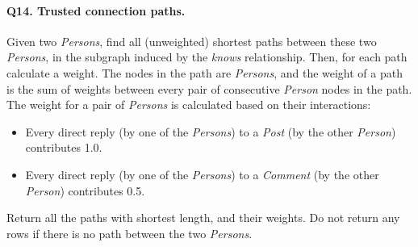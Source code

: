 \paragraph{\textbf{Q14}. Trusted connection paths.}
Given two \emph{Persons}, find all (unweighted) shortest paths between
these two \emph{Persons}, in the subgraph induced by the \emph{knows}
relationship.
Then, for each path calculate a weight. The nodes in the path are
\emph{Persons}, and the weight of a path is the sum of weights between
every pair of consecutive \emph{Person} nodes in the path.
The weight for a pair of \emph{Persons} is calculated based on their
interactions:
\begin{itemize}
\tightlist
\item
  Every direct reply (by one of the \emph{Persons}) to a \emph{Post} (by
  the other \emph{Person}) contributes 1.0.
\item
  Every direct reply (by one of the \emph{Persons}) to a \emph{Comment}
  (by the other \emph{Person}) contributes 0.5.
\end{itemize}
Return all the paths with shortest length, and their weights. Do not
return any rows if there is no path between the two \emph{Persons}.
